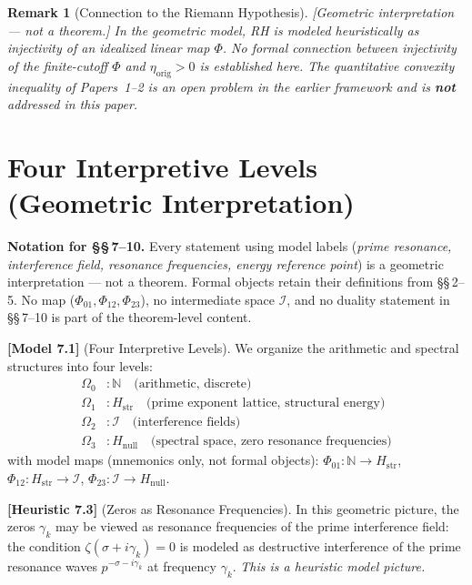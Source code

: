 \documentclass[11pt]{article}
\newtheorem*{remark}{Remark}
\newcommand{\Hstr}{H_{\mathrm{str}}}
\newcommand{\Hnull}{H_{\mathrm{null}}}
\newcommand{\etaorig}{\eta_{\mathrm{orig}}}
\begin{document}
\begin{remark}[Connection to the Riemann Hypothesis]
\emph{[Geometric interpretation --- not a theorem.]}
In the geometric model, RH is modeled heuristically as injectivity of an
idealized linear map $\Phi$. No formal connection between injectivity of the
finite-cutoff $\Phi$ and $\etaorig>0$ is established here. The quantitative
convexity inequality of Papers~1--2 is an open problem in the earlier framework
and is \textbf{not} addressed in this paper.
\end{remark}

\section{Four Interpretive Levels (Geometric Interpretation)}

\textbf{Notation for \S\S\,7--10.}
Every statement using model labels
(\emph{prime resonance, interference field, resonance frequencies, energy
reference point}) is a geometric interpretation --- not a theorem.
Formal objects retain their definitions from \S\S\,2--5.
No map ($\Phi_{01},\Phi_{12},\Phi_{23}$), no intermediate space $\mathcal{I}$,
and no duality statement in \S\S\,7--10 is part of the theorem-level content.

\textbf{[Model 7.1]} (Four Interpretive Levels).
We organize the arithmetic and spectral structures into four levels:
\begin{align*}
\Omega_0 &: \mathbb{N}\quad\text{(arithmetic, discrete)}\\
\Omega_1 &: \Hstr\quad\text{(prime exponent lattice, structural energy)}\\
\Omega_2 &: \mathcal{I}\quad\text{(interference fields)}\\
\Omega_3 &: \Hnull\quad\text{(spectral space, zero resonance frequencies)}
\end{align*}
with model maps (mnemonics only, not formal objects):
$\Phi_{01}:\mathbb{N}\to\Hstr$,
$\Phi_{12}:\Hstr\to\mathcal{I}$,
$\Phi_{23}:\mathcal{I}\to\Hnull$.

\textbf{[Heuristic 7.3]} (Zeros as Resonance Frequencies).
In this geometric picture, the zeros $\gamma_k$ may be viewed as resonance
frequencies of the prime interference field: the condition
$\zeta(\sigma+i\gamma_k)=0$ is modeled as destructive interference of the
prime resonance waves $p^{-\sigma-i\gamma_k}$ at frequency $\gamma_k$.
\emph{This is a heuristic model picture.}
\end{document}
